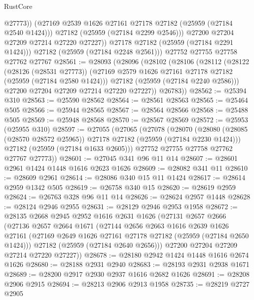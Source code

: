 \begin{lexlean}{RustCore}
\begin{coremodule}
                  @27773))
              (@27169 @2539 @1626 @27161 @27178 @27182 (@25959 (@27184 @2540 @1424)))
              @27182
              (@25959 (@27184 @2299 @2546)))
            @27200
            @27204
            @27209
            @27214
            @27220
            @27227))
        @27178
        @27182
        (@25959 (@27184 @2291 @1424)))
      @27182
      (@25959 (@27184 @2248 @2561)))
    @27752
    @27755
    @27758
    @27762
    @27767
@28561 := @28093
    (@28096
      (@28102
        (@28106
          (@28112
            (@28122
              (@28126 (@28531 @27773))
              (@27169 @2579 @1626 @27161 @27178 @27182 (@25959 (@27184 @2580 @1424)))
              @27182
              (@25959 (@27184 @2240 @2586)))
            @27200
            @27204
            @27209
            @27214
            @27220
            @27227))
        @26783))
@28562 := @25394 @310
@28563 := @25590 @28562
@28564 := @28561 @28563
@28565 := @25464 @505
@28566 := @25944 @28565
@28567 := @28564 @28566
@28568 := @25488 @505
@28569 := @25948 @28568
@28570 := @28567 @28569
@28572 := @25953 (@25955 @310)
@28597 := @27055
    (@27065
      (@27078
        (@28070
          (@28080 (@28085 (@28570 @28572 @25965)) @27178 @27182 (@25959 (@27184 @2230 @1424)))
          @27182
          (@25959 (@27184 @1633 @2605)))
        @27752
        @27755
        @27758
        @27762
        @27767
        @27773))
@28601 := @27045 @341 @96 @11 @14
@28607 := @28601 @2961 @1424 @1448 @1616 @2623 @1626
@28609 := @28082 @341 @11
@28610 := @28609 @2961
@28614 := @28086 @340 @15 @11 @1424
@28617 := @28614 @2959 @1342 @505
@28619 := @26758 @340 @15
@28620 := @28619 @2959
@28624 := @26763 @328 @96 @11 @14
@28626 := @28624 @2957 @1448
@28628 := @28124 @2946 @2955
@28631 := @28129 @2946 @2953 @1958
@28672 := @28135
    @2668
    @2945
    @2952
    @1616
    @2631
    @1626
    (@27131
      @2657
      @2666
      (@27136
        @2657
        @2664
        @1671
        (@27144
          @2656
          @2663
          @1616
          @2639
          @1626
          @27161
          (@27169 @2649 @1626 @27161 @27178 @27182 (@25959 (@27184 @2650 @1424)))
          @27182
          (@25959 (@27184 @2640 @2656)))
        @27200
        @27204
        @27209
        @27214
        @27220
        @27227))
@28678 := @28180 @2942 @1424 @1448 @1616 @2674 @1626
@28680 := @28188 @2931 @2940
@28683 := @28193 @2931 @2938 @1671
@28689 := @28200 @2917 @2930 @2937 @1616 @2682 @1626
@28691 := @28208 @2906 @2915
@28694 := @28213 @2906 @2913 @1958
@28735 := @28219
    @2727
    @2905

\end{coremodule}
\end{lexlean}
